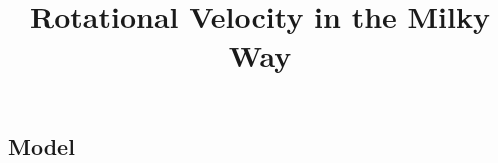 \documentclass{article}
\title{Rotational Velocity in the Milky Way}
\begin{document}
\maketitle




\begin{multicols}{2}

\section{Model}








\end{multicols}

\printbibliography
\end{document}
